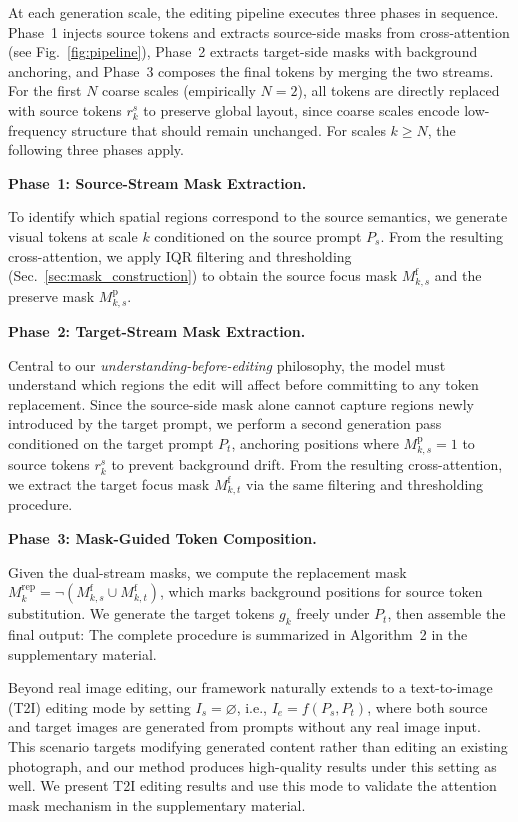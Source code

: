 At each generation scale, the editing pipeline executes three phases in sequence. Phase~1 injects source tokens and extracts source-side masks from cross-attention (see Fig.~\ref{fig:pipeline}), Phase~2 extracts target-side masks with background anchoring, and Phase~3 composes the final tokens by merging the two streams. For the first $N$ coarse scales (empirically $N{=}2$), all tokens are directly replaced with source tokens $r_k^s$ to preserve global layout, since coarse scales encode low-frequency structure that should remain unchanged. For scales $k \geq N$, the following three phases apply.

\noindent\textbf{Phase~1: Source-Stream Mask Extraction.}

To identify which spatial regions correspond to the source semantics, we generate visual tokens at scale $k$ conditioned on the source prompt $P_s$. From the resulting cross-attention, we apply IQR filtering and thresholding (Sec.~\ref{sec:mask_construction}) to obtain the source focus mask $M_{k,s}^{\mathrm{f}}$ and the preserve mask $M_{k,s}^{\mathrm{p}}$.

\noindent\textbf{Phase~2: Target-Stream Mask Extraction.}

Central to our \textit{understanding-before-editing} philosophy, the model must understand which regions the edit will affect before committing to any token replacement. Since the source-side mask alone cannot capture regions newly introduced by the target prompt, we perform a second generation pass conditioned on the target prompt $P_t$, anchoring positions where $M_{k,s}^{\mathrm{p}} = 1$ to source tokens $r_k^s$ to prevent background drift. From the resulting cross-attention, we extract the target focus mask $M_{k,t}^{\mathrm{f}}$ via the same filtering and thresholding procedure.

\noindent\textbf{Phase~3: Mask-Guided Token Composition.}

Given the dual-stream masks, we compute the replacement mask $M_k^{\mathrm{rep}} = \neg(M_{k,s}^{\mathrm{f}} \cup M_{k,t}^{\mathrm{f}})$, which marks background positions for source token substitution. We generate the target tokens $g_k$ freely under $P_t$, then assemble the final output:
\EqTokenReplace
The complete procedure is summarized in Algorithm~2 in the supplementary material.

Beyond real image editing, our framework naturally extends to a text-to-image (T2I) editing mode by setting $I_s = \varnothing$, i.e., $I_e = f(P_s, P_t)$, where both source and target images are generated from prompts without any real image input. This scenario targets modifying generated content rather than editing an existing photograph, and our method produces high-quality results under this setting as well. We present T2I editing results and use this mode to validate the attention mask mechanism in the supplementary material.